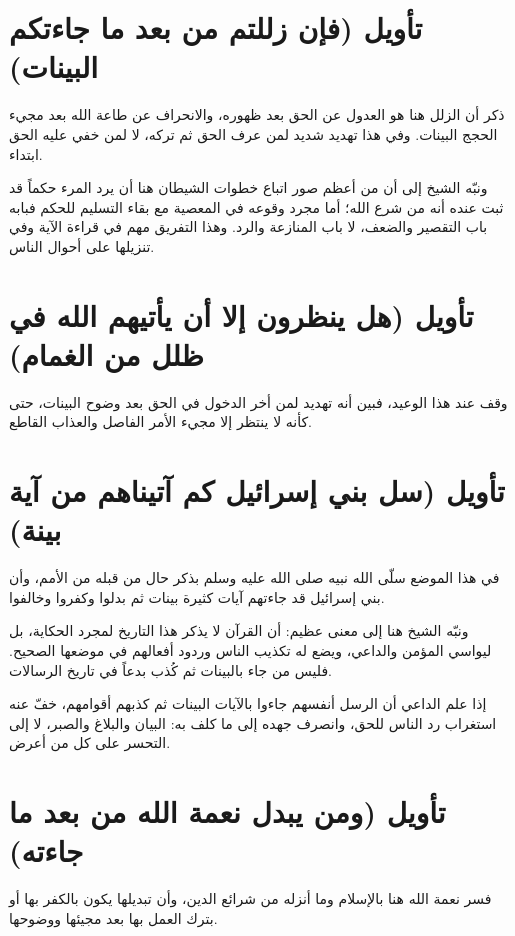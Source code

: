 \separator

\section{تأويل (فإن زللتم من بعد ما جاءتكم البينات)}
ذكر  أن الزلل هنا هو العدول عن الحق بعد ظهوره، والانحراف عن طاعة الله بعد مجيء الحجج البينات. وفي هذا تهديد شديد لمن عرف الحق ثم تركه، لا لمن خفي عليه الحق ابتداء.

ونبّه الشيخ إلى أن من أعظم صور اتباع خطوات الشيطان هنا أن يرد المرء حكماً قد ثبت عنده أنه من شرع الله؛ أما مجرد وقوعه في المعصية مع بقاء التسليم للحكم فبابه باب التقصير والضعف، لا باب المنازعة والرد. وهذا التفريق مهم في قراءة الآية وفي تنزيلها على أحوال الناس.

\section{تأويل (هل ينظرون إلا أن يأتيهم الله في ظلل من الغمام)}
وقف  عند هذا الوعيد، فبين أنه تهديد لمن أخر الدخول في الحق بعد وضوح البينات، حتى كأنه لا ينتظر إلا مجيء الأمر الفاصل والعذاب القاطع.

\section{تأويل (سل بني إسرائيل كم آتيناهم من آية بينة)}
في هذا الموضع سلّى الله نبيه صلى الله عليه وسلم بذكر حال من قبله من الأمم، وأن بني إسرائيل قد جاءتهم آيات كثيرة بينات ثم بدلوا وكفروا وخالفوا.

ونبّه الشيخ هنا إلى معنى عظيم: أن القرآن لا يذكر هذا التاريخ لمجرد الحكاية، بل ليواسي المؤمن والداعي، ويضع له تكذيب الناس وردود أفعالهم في موضعها الصحيح. فليس من جاء بالبينات ثم كُذب بدعاً في تاريخ الرسالات.

\begin{fawaid}
إذا علم الداعي أن الرسل أنفسهم جاءوا بالآيات البينات ثم كذبهم أقوامهم، خفّ عنه استغراب رد الناس للحق، وانصرف جهده إلى ما كلف به: البيان والبلاغ والصبر، لا إلى التحسر على كل من أعرض.
\end{fawaid}

\section{تأويل (ومن يبدل نعمة الله من بعد ما جاءته)}
فسر  نعمة الله هنا بالإسلام وما أنزله من شرائع الدين، وأن تبديلها يكون بالكفر بها أو بترك العمل بها بعد مجيئها ووضوحها.

